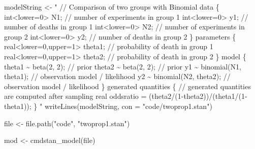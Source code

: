 \documentclass[
  11pt,
  italian,
  a4paper,
  extrafontsizes,onecolumn,openright
  ]{memoir}
\newenvironment{Shaded}{\begin{snugshade}}{\end{snugshade}}
\newcommand{\AttributeTok}[1]{\textcolor[rgb]{0.77,0.63,0.00}{#1}}
\newcommand{\DecValTok}[1]{\textcolor[rgb]{0.00,0.00,0.81}{#1}}
\newcommand{\FunctionTok}[1]{\textcolor[rgb]{0.00,0.00,0.00}{#1}}
\newcommand{\NormalTok}[1]{#1}
\newcommand{\OtherTok}[1]{\textcolor[rgb]{0.56,0.35,0.01}{#1}}
\newcommand{\SpecialCharTok}[1]{\textcolor[rgb]{0.00,0.00,0.00}{#1}}
\newcommand{\StringTok}[1]{\textcolor[rgb]{0.31,0.60,0.02}{#1}}
\begin{document}
\begin{Shaded}
\begin{Highlighting}[]
\NormalTok{modelString }\OtherTok{\textless{}{-}} \StringTok{"}
\StringTok{//  Comparison of two groups with Binomial}
\StringTok{data \{}
\StringTok{  int\textless{}lower=0\textgreater{} N1;              // number of experiments in group 1}
\StringTok{  int\textless{}lower=0\textgreater{} y1;              // number of deaths in group 1}
\StringTok{  int\textless{}lower=0\textgreater{} N2;              // number of experiments in group 2}
\StringTok{  int\textless{}lower=0\textgreater{} y2;              // number of deaths in group 2}
\StringTok{\}}
\StringTok{parameters \{}
\StringTok{  real\textless{}lower=0,upper=1\textgreater{} theta1; // probability of death in group 1}
\StringTok{  real\textless{}lower=0,upper=1\textgreater{} theta2; // probability of death in group 2}
\StringTok{\}}
\StringTok{model \{}
\StringTok{  theta1 \textasciitilde{} beta(2, 2);          // prior}
\StringTok{  theta2 \textasciitilde{} beta(2, 2);          // prior}
\StringTok{  y1 \textasciitilde{} binomial(N1, theta1);    // observation model / likelihood}
\StringTok{  y2 \textasciitilde{} binomial(N2, theta2);    // observation model / likelihood}
\StringTok{\}}
\StringTok{generated quantities \{}
\StringTok{  // generated quantities are computed after sampling}
\StringTok{  real oddsratio = (theta2/(1{-}theta2))/(theta1/(1{-}theta1));}
\StringTok{\}}
\StringTok{"}
\FunctionTok{writeLines}\NormalTok{(modelString, }\AttributeTok{con =} \StringTok{"code/twoprop1.stan"}\NormalTok{)}
\end{Highlighting}
\end{Shaded}

\begin{Shaded}
\begin{Highlighting}[]
\NormalTok{file }\OtherTok{\textless{}{-}} \FunctionTok{file.path}\NormalTok{(}\StringTok{"code"}\NormalTok{, }\StringTok{"twoprop1.stan"}\NormalTok{)}
\end{Highlighting}
\end{Shaded}

\begin{Shaded}
\begin{Highlighting}[]
\NormalTok{mod }\OtherTok{\textless{}{-}} \FunctionTok{cmdstan\_model}\NormalTok{(file)}
\end{Highlighting}
\end{Shaded}

\begin{Shaded}
\end{Shaded}
\end{document}
